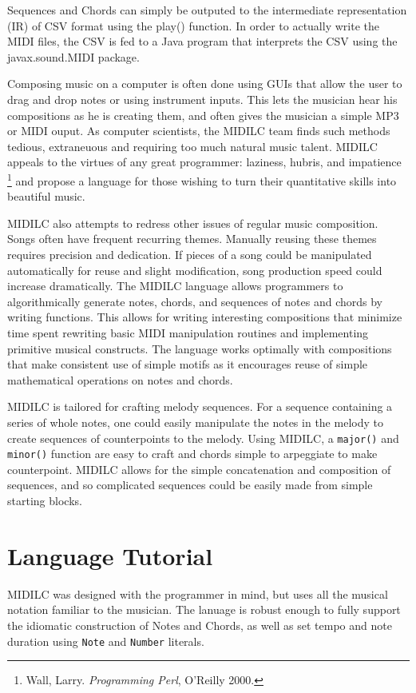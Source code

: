 \documentclass[12pt,A4]{book}
\begin{document}
Sequences and Chords can simply be outputed to the intermediate representation (IR) of CSV format using the play() function. In order to actually write the MIDI files, the CSV is fed to a Java program that interprets the CSV using the javax.sound.MIDI package.

Composing music on a computer is often done using GUIs that allow the user to drag and drop notes or using instrument inputs. This lets the musician hear his compositions as he is creating them, and often gives the musician a simple MP3 or MIDI ouput. As computer scientists, the MIDILC team finds such methods tedious, extraneuous and requiring too much natural music talent. MIDILC appeals to the virtues of any great programmer: laziness, hubris, and impatience \footnote{Wall, Larry. \textit{Programming Perl}, O'Reilly 2000.} and propose a language for those wishing to turn their quantitative skills into beautiful music.

MIDILC also attempts to redress other issues of regular music composition. Songs often have frequent recurring themes. Manually reusing these themes requires precision and dedication. If pieces of a song could be manipulated automatically for reuse and slight modification, song production speed could increase dramatically. The MIDILC language allows programmers to algorithmically generate notes, chords, and sequences of notes and chords by writing functions. This allows for writing interesting compositions that minimize time spent rewriting basic MIDI manipulation routines and implementing primitive musical constructs. The language works optimally with compositions that make consistent use of simple motifs as it encourages reuse of simple mathematical operations on notes and chords. 

MIDILC is tailored for crafting melody sequences. For a sequence containing a series of whole notes, one could easily manipulate the notes in the melody to create sequences of counterpoints to the melody. Using MIDILC, a \verb|major()| and \verb|minor()| function are easy to craft and chords simple to arpeggiate to make counterpoint. MIDILC allows for the simple concatenation and composition of sequences, and so complicated sequences could be easily made from simple starting blocks.

\chapter{Language Tutorial}
MIDILC was designed with the programmer in mind, but uses all the musical notation familiar to the musician. The lanuage is robust enough to fully support the idiomatic construction of Notes and Chords, as well as set tempo and note duration using \verb|Note| and \verb|Number| literals.
\end{document}
